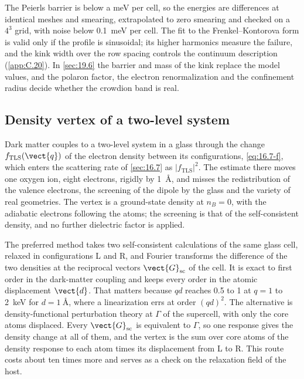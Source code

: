 The Peierls barrier is below a meV per cell, so the energies are differences at identical meshes and smearing, extrapolated to zero smearing and checked on a $4^3$ grid, with noise below \SI{0.1}{meV} per cell. The fit to the Frenkel--Kontorova form is valid only if the profile is sinusoidal; its higher harmonics measure the failure, and the kink width over the row spacing controls the continuum description (\cref{app:C.20}). In \cref{sec:19.6} the barrier and mass of the kink replace the model values, and the polaron factor, the electron renormalization and the confinement radius decide whether the crowdion band is real.

\subsection{Density vertex of a two-level system}

Dark matter couples to a two-level system in a glass through the change $f_{\mathrm{TLS}}(\vect{q})$ of the electron density between its configurations, \cref{eq:16.7-f}, which enters the scattering rate of \cref{sec:16.7} as $|f_{\mathrm{TLS}}|^2$. The estimate there moves one oxygen ion, eight electrons, rigidly by \SI{1}{\angstrom}, and misses the redistribution of the valence electrons, the screening of the dipole by the glass and the variety of real geometries. The vertex is a ground-state density at $n_B = 0$, with the adiabatic electrons following the atoms; the screening is that of the self-consistent density, and no further dielectric factor is applied.

The preferred method takes two self-consistent calculations of the same glass cell, relaxed in configurations L and R, and Fourier transforms the difference of the two densities at the reciprocal vectors $\vect{G}_{\mathrm{sc}}$ of the cell. It is exact to first order in the dark-matter coupling and keeps every order in the atomic displacement $\vect{d}$. That matters because $qd$ reaches 0.5 to 1 at $q = 1$ to \SI{2}{keV} for $d = \SI{1}{\angstrom}$, where a linearization errs at order $(qd)^2$. The alternative is density-functional perturbation theory at $\Gamma$ of the supercell, with only the core atoms displaced. Every $\vect{G}_{\mathrm{sc}}$ is equivalent to $\Gamma$, so one response gives the density change at all of them, and the vertex is the sum over core atoms of the density response to each atom times its displacement from L to R. This route costs about ten times more and serves as a check on the relaxation field of the host.

